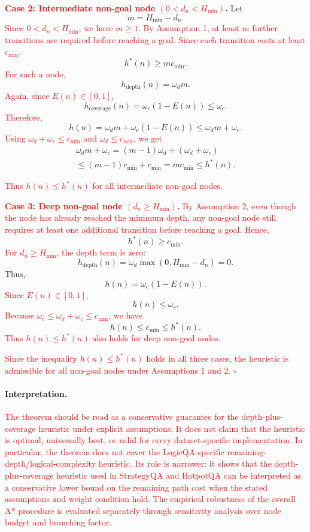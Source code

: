 \documentclass[11pt]{article}
\begin{document}
{\textcolor{red}{\textbf{Case 2: Intermediate non-goal node \((0<d_n<H_{\min})\).}}
Let
\[
m = H_{\min}-d_n.
\]
\textcolor{red}{Since \(0<d_n<H_{\min}\), we have \(m\geq 1\). By Assumption 1, at least \(m\) further transitions are required before reaching a goal. Since each transition costs at least \(c_{\min}\),}
\[
h^*(n) \geq m c_{\min}.
\]
\textcolor{red}{For such a node,}
\[
h_{\mathrm{depth}}(n)=\omega_d m.
\]
\textcolor{red}{Again, since \(E(n)\in[0,1]\),}
\[
h_{\mathrm{coverage}}(n)=\omega_c(1-E(n))\leq \omega_c.
\]
\textcolor{red}{Therefore,}
\[
h(n)=\omega_d m+\omega_c(1-E(n))
\leq \omega_d m+\omega_c.
\]
\textcolor{red}{Using \(\omega_d+\omega_c\leq c_{\min}\) and \(\omega_d\leq c_{\min}\), we get}
\begin{multline}
    \omega_d m+\omega_c
= (m-1)\omega_d+(\omega_d+\omega_c) \\
\leq (m-1)c_{\min}+c_{\min}
= m c_{\min}
\leq h^*(n).
\end{multline}


\textcolor{red}{Thus \(h(n)\leq h^*(n)\) for all intermediate non-goal nodes.}

\textcolor{red}{\textbf{Case 3: Deep non-goal node \((d_n\geq H_{\min})\).}}
\textcolor{red}{By Assumption 2, even though the node has already reached the minimum depth, any non-goal node still requires at least one additional transition before reaching a goal. Hence,}
\[
h^*(n)\geq c_{\min}.
\]
\textcolor{red}{For \(d_n\geq H_{\min}\), the depth term is zero:}
\[
h_{\mathrm{depth}}(n)=\omega_d\max(0,H_{\min}-d_n)=0.
\]
Thus,
\[
h(n)=\omega_c(1-E(n)).
\]
\textcolor{red}{Since \(E(n)\in[0,1]\),}
\[
h(n)\leq \omega_c.
\]
\textcolor{red}{Because \(\omega_c\leq \omega_d+\omega_c\leq c_{\min}\), we have}
\[
h(n)\leq c_{\min}\leq h^*(n).
\]
\textcolor{red}{Thus \(h(n)\leq h^*(n)\) also holds for deep non-goal nodes.}

\textcolor{red}{Since the inequality \(h(n)\leq h^*(n)\) holds in all three cases, the heuristic is admissible for all non-goal nodes under Assumptions 1 and 2.}
\textcolor{red}{\(\square\)}

\paragraph{Interpretation.}
\textcolor{red}{The theorem should be read as a conservative guarantee for the depth-plus-coverage heuristic under explicit assumptions. It does not claim that the heuristic is optimal, universally best, or valid for every dataset-specific implementation. In particular, the theorem does not cover the LogicQA-specific remaining-depth/logical-complexity heuristic. Its role is narrower: it shows that the depth-plus-coverage heuristic used in StrategyQA and HotpotQA can be interpreted as a conservative lower bound on the remaining path cost when the stated assumptions and weight condition hold. The empirical robustness of the overall A* procedure is evaluated separately through sensitivity analysis over node budget and branching factor.}



}
\end{document}
